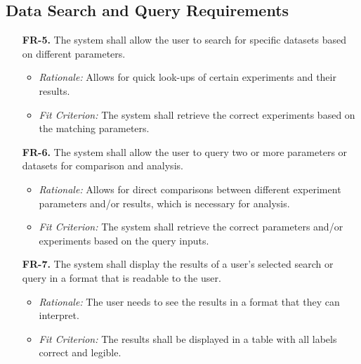 \documentclass[12pt]{article}
\begin{document}
\subsection{Data Search and Query Requirements}
\begin{enumerate}
  \item[\textbf{FR-5.}] The system shall allow the user to search for specific
  datasets based on different parameters.
  \begin{itemize}
    \item \textit{Rationale:} Allows for quick look-ups of certain experiments
    and their results.
    \item \textit{Fit Criterion:} The system shall retrieve the correct
    experiments based on the matching parameters.
  \end{itemize}
  \item[\textbf{FR-6.}] The system shall allow the user to query two or more
  parameters or datasets for comparison and analysis.
  \begin{itemize}
    \item \textit{Rationale:} Allows for direct comparisons between different
    experiment parameters and/or results, which is necessary for analysis.
    \item \textit{Fit Criterion:} The system shall retrieve the correct
    parameters and/or experiments based on the query inputs.
  \end{itemize}
  \item[\textbf{FR-7.}] The system shall display the results of a user’s
  selected search or query in a format that is readable to the user.
  \begin{itemize}
    \item \textit{Rationale:} The user needs to see the results in a format that
    they can interpret.
    \item \textit{Fit Criterion:} The results shall be displayed in a table with
    all labels correct and legible.
  \end{itemize}
\end{enumerate}
\end{document}
